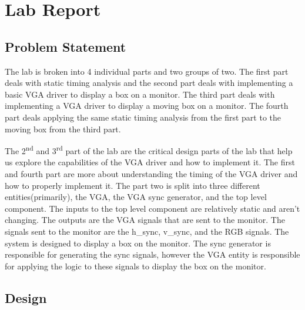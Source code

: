 \documentclass{article}
\begin{document}
\section*{Lab Report}

\subsection*{Problem Statement}
  The lab is broken into 4 individual parts and two groups of two. The first part deals with static timing analysis and the second part deals with implementing a basic VGA driver to display a box on a monitor. The third part deals with implementing a VGA driver to display a moving box on a monitor. The fourth part deals applying the same static timing analysis from the first part to the moving box from the third part.

  The 2\textsuperscript{nd} and 3\textsuperscript{rd} part of the lab are the critical design parts of the lab that help us explore the capabilities of the VGA driver and how to implement it. The first and fourth part are more about understanding the timing of the VGA driver and how to properly implement it. The part two is split into three different entities(primarily), the VGA, the VGA sync generator, and the top level component. The inputs to the top level component are relatively static and aren't changing. The outputs are the VGA signals that are sent to the monitor. The signals sent to the monitor are the h\_sync, v\_sync, and the RGB signals. The system is designed to display a box on the monitor. The sync generator is responsible for generating the sync signals, however the VGA entity is responsible for applying the logic to these signals to display the box on the monitor.

\subsection*{Design}
\end{document}
